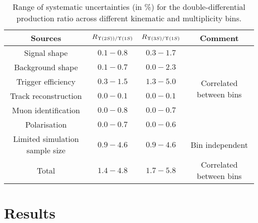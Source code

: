 \documentclass[12pt,a4paper]{article}
\begin{document}
\begin{table}[t]
\centering
\caption{Range of systematic uncertainties (in \%) for the double-differential production ratio across different kinematic and multiplicity bins.}
\begin{center}
\begin{tabular}{cccc}
\hline
Sources& $R_{{\Upsilon{(2S)})}/{\Upsilon{(1S)}}}$& $R_{{\Upsilon{(3S)}}/{\Upsilon{(1S)}}}$&Comment\\
\hline Signal shape & $0.1-0.8$ & $0.3-1.7$ & \multirow{6}{*}{Correlated between bins} \\
 Background shape & $0.1-0.7$ & $0.0-2.3$&  \\
 Trigger efficiency & $0.3-1.5$ & $1.3-5.0$ &  \\
Track reconstruction & $0.0-0.1$& $0.0-0.1$ &\\
Muon identification & $0.0-0.8$  & $0.0-0.7$ &\\
Polarisation & $0.0-0.7$ & $0.0-0.6$  &\\
 \hline Limited simulation sample size
 & $0.9-4.6$ & $0.9-4.6$ & Bin independent\\
\hline  Total
 & $1.4-4.8$ & $1.7-5.8$ & Correlated between bins\\
\hline
\end{tabular}
\end{center}
\label{tab:SystematicSummary}
\end{table}


\section{Results}
\end{document}
